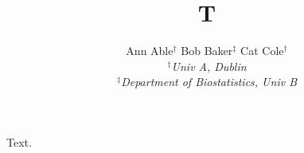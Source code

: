 \documentclass{article}
\title{T}
\author{Ann Able$^{\dagger}$ \quad Bob Baker$^{\ddagger}$ \quad Cat Cole$^{\dagger}$ \\ {\it \normalsize $^{\dagger}$Univ A, Dublin} \\ {\it \normalsize $^{\ddagger}$Department of Biostatistics, Univ B}}
\begin{document}
\maketitle
Text.
\end{document}
